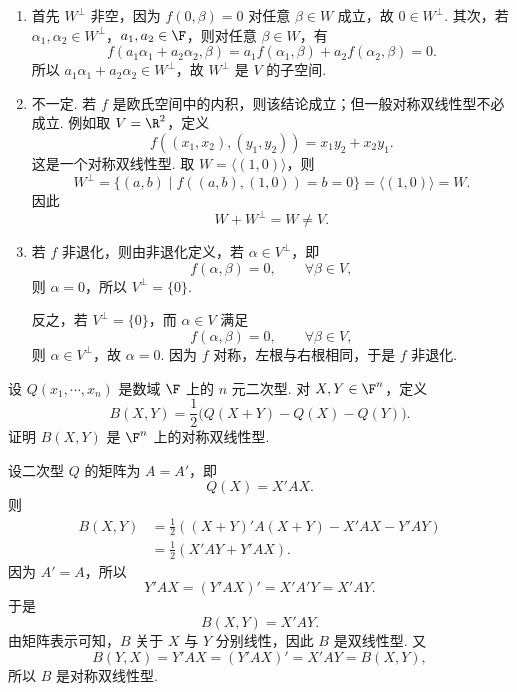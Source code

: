 \begin{solution}
	\begin{enumerate}
		\item 首先 $W^\perp$ 非空，因为 $f(0,\beta)=0$ 对任意 $\beta\in W$ 成立，故 $0\in W^\perp$. 其次，若 $\alpha_1,\alpha_2\in W^\perp$，$a_1,a_2\in\F$，则对任意 $\beta\in W$，有
		\[
		f(a_1\alpha_1+a_2\alpha_2,\beta)
		=a_1f(\alpha_1,\beta)+a_2f(\alpha_2,\beta)=0.
		\]
		所以 $a_1\alpha_1+a_2\alpha_2\in W^\perp$，故 $W^\perp$ 是 $V$ 的子空间.
		
		\item 不一定. 若 $f$ 是欧氏空间中的内积，则该结论成立；但一般对称双线性型不必成立. 例如取 $V=\R^2$，定义
		\[
		f((x_1,x_2),(y_1,y_2))=x_1y_2+x_2y_1.
		\]
		这是一个对称双线性型. 取 $W=\langle (1,0)\rangle$，则
		\[
		W^\perp=\{(a,b)\mid f((a,b),(1,0))=b=0\}
		=\langle(1,0)\rangle=W.
		\]
		因此
		\[
		W+W^\perp=W\ne V.
		\]
		
		\item 若 $f$ 非退化，则由非退化定义，若 $\alpha\in V^\perp$，即
		\[
		f(\alpha,\beta)=0,
		\qquad \forall \beta\in V,
		\]
		则 $\alpha=0$，所以 $V^\perp=\{0\}$.
		
		反之，若 $V^\perp=\{0\}$，而 $\alpha\in V$ 满足
		\[
		f(\alpha,\beta)=0,
		\qquad \forall \beta\in V,
		\]
		则 $\alpha\in V^\perp$，故 $\alpha=0$. 因为 $f$ 对称，左根与右根相同，于是 $f$ 非退化.
	\end{enumerate}
\end{solution}

\begin{problem}

	设 $Q(x_1,\cdots,x_n)$ 是数域 $\F$ 上的 $n$ 元二次型. 对 $X,Y\in\F^n$，定义
	\[
	B(X,Y)=\frac12\bigl(Q(X+Y)-Q(X)-Q(Y)\bigr).
	\]
	证明 $B(X,Y)$ 是 $\F^n$ 上的对称双线性型.
\end{problem}

\begin{solution}
	设二次型 $Q$ 的矩阵为 $A=A'$，即
	\[
	Q(X)=X'AX.
	\]
	则
	\[
	\begin{aligned}
		B(X,Y)
		&=\frac12\left((X+Y)'A(X+Y)-X'AX-Y'AY\right) \\
		&=\frac12\left(X'AY+Y'AX\right).
	\end{aligned}
	\]
	因为 $A'=A$，所以
	\[
	Y'AX=(Y'AX)'=X'A'Y=X'AY.
	\]
	于是
	\[
	B(X,Y)=X'AY.
	\]
	由矩阵表示可知，$B$ 关于 $X$ 与 $Y$ 分别线性，因此 $B$ 是双线性型. 又
	\[
	B(Y,X)=Y'AX=(Y'AX)'=X'AY=B(X,Y),
	\]
	所以 $B$ 是对称双线性型.
\end{solution}


